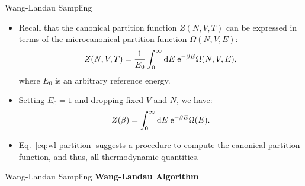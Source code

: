 \documentclass[10pt]{beamer}
\begin{document}
\begin{frame}{Wang-Landau Sampling}
\begin{itemize}
\setlength\itemsep{1em}
  \item Recall that the canonical partition function $Z(N,V,T)$ can be expressed in terms of the microcanonical partition function $\Omega(N,V,E)$:
  \begin{equation}
    Z(N,V,T) = \frac{1}{E_0} \int_0^\infty \mathrm{d} E\; \mathrm{e}^{-\beta E} \Omega(N,V,E),
  \end{equation}
  where $E_0$ is an arbitrary reference energy.

  \item Setting $E_0=1$ and dropping fixed $V$ and $N$, we have:
  \begin{equation}
  \label{eq:wl-partition}
    Z(\beta) = \int_0^\infty \mathrm{d} E\; \mathrm{e}^{-\beta E}\Omega(E).
  \end{equation}

  \item Eq.~\ref{eq:wl-partition} suggests a procedure to compute the canonical partition function, and thus, all thermodynamic quantities.

  \end{itemize}
\end{frame}

\begin{frame}{Wang-Landau Sampling}
\textbf{Wang-Landau Algorithm}
\vspace{0.2cm}
\end{frame}
\end{document}

